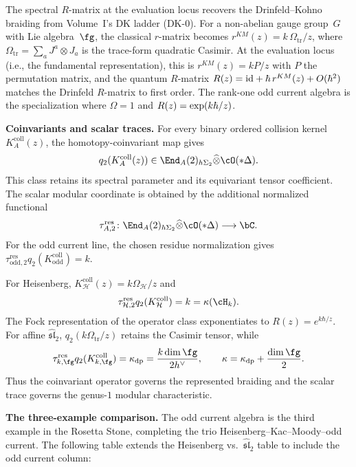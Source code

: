 \begin{remark}
\label{rem:rosetta-cs-dk}
The spectral $R$-matrix at the evaluation locus recovers the
Drinfeld--Kohno braiding from Volume~I's DK ladder (DK-0).
For a non-abelian gauge group~$G$ with Lie algebra~$\fg$, the
classical $r$-matrix becomes
$r^{KM}(z) = k\,\Omega_{\mathrm{tr}}/z$,
where $\Omega_{\mathrm{tr}} = \sum_a J^a \otimes J_a$ is the
trace-form quadratic Casimir.
At the evaluation locus (i.e., the fundamental representation),
this is $r^{KM}(z) = k P / z$ with $P$ the permutation matrix, and
the quantum $R$-matrix $R(z) = \mathrm{id} + \hbar\, r^{KM}(z) + O(\hbar^2)$
matches the Drinfeld $R$-matrix to first order. The rank-one
odd current algebra is the specialization where $\Omega = 1$ and
$R(z) = \exp(k\hbar/z)$.
\end{remark}

\medskip
\noindent\textbf{Coinvariants and scalar traces.}\enspace
{}
For every binary ordered collision kernel $K_A^{\mathrm{coll}}(z)$,
the homotopy-coinvariant map gives
\[
 q_2(K_A^{\mathrm{coll}}(z))
 \in\End_A(2)_{h\Sigma_2}\widehat\otimes\cO(*\Delta).
\]
This class retains its spectral parameter and its equivariant tensor
coefficient.  The scalar modular coordinate is obtained by the
additional normalized functional
\[
 \tau_{A,2}^{\mathrm{res}}\colon
 \End_A(2)_{h\Sigma_2}\widehat\otimes\cO(*\Delta)\longrightarrow\bC.
\]
For the odd current line, the chosen residue normalization gives
$\tau_{\mathrm{odd},2}^{\mathrm{res}}
q_2(K_{\mathrm{odd}}^{\mathrm{coll}})=k$.

For Heisenberg,
$K_{\mathcal H}^{\mathrm{coll}}(z)=k\Omega_{\mathcal H}/z$ and
\[
 \tau_{\mathcal H,2}^{\mathrm{res}}
 q_2(K_{\mathcal H}^{\mathrm{coll}})=k=\kappa(\cH_k).
\]
The Fock representation of the operator class exponentiates to
$R(z)=e^{k\hbar/z}$.  For affine
$\widehat{\mathfrak{sl}}_2$,
$q_2(k\Omega_{\mathrm{tr}}/z)$ retains the Casimir tensor, while
\[
 \tau_{k,\fg}^{\mathrm{res}}
 q_2(K_{k,\fg}^{\mathrm{coll}})
 =\kappa_{\mathrm{dp}}
 =\frac{k\dim\fg}{2h^\vee},
 \qquad
 \kappa=\kappa_{\mathrm{dp}}+\frac{\dim\fg}{2}.
\]
Thus the coinvariant operator governs the represented braiding and
the scalar trace governs the genus-$1$ modular characteristic.

\medskip
\noindent\textbf{The three-example comparison.}\enspace
The odd current algebra is the third example in the Rosetta Stone,
completing the trio Heisenberg--Kac--Moody--odd current. The following
table extends the Heisenberg vs.~$\widehat{\mathfrak{sl}}_2$ table to
include the odd current column:

